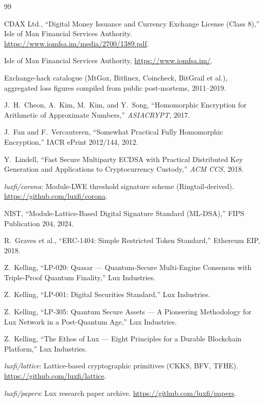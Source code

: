 
\begin{thebibliography}{99}

CDAX Ltd., ``Digital Money Issuance and Currency Exchange License
(Class 8),'' Isle of Man Financial Services Authority.
\url{https://www.iomfsa.im/media/2700/1389.pdf}.

Isle of Man Financial Services Authority,
\url{https://www.iomfsa.im/}.

Exchange-hack catalogue (MtGox, Bitfinex, Coincheck, BitGrail et al.),
aggregated loss figures compiled from public post-mortems, 2011--2019.

J.~H.~Cheon, A.~Kim, M.~Kim, and Y.~Song, ``Homomorphic Encryption for
Arithmetic of Approximate Numbers,'' \textit{ASIACRYPT}, 2017.

J.~Fan and F.~Vercauteren, ``Somewhat Practical Fully Homomorphic
Encryption,'' IACR ePrint 2012/144, 2012.

Y.~Lindell, ``Fast Secure Multiparty ECDSA with Practical Distributed
Key Generation and Applications to Cryptocurrency Custody,''
\textit{ACM CCS}, 2018.

\textit{luxfi/corona}: Module-LWE threshold signature scheme (Ringtail-derived).
\url{https://github.com/luxfi/corona}.

NIST, ``Module-Lattice-Based Digital Signature Standard (ML-DSA),''
FIPS Publication 204, 2024.

R.~Graves et al., ``ERC-1404: Simple Restricted Token Standard,''
Ethereum EIP, 2018.

Z.~Kelling, ``LP-020: Quasar --- Quantum-Secure Multi-Engine Consensus
with Triple-Proof Quantum Finality,'' Lux Industries.

Z.~Kelling, ``LP-001: Digital Securities Standard,'' Lux Industries.

Z.~Kelling, ``LP-305: Quantum Secure Assets --- A Pioneering
Methodology for Lux Network in a Post-Quantum Age,'' Lux Industries.

Z.~Kelling, ``The Ethos of Lux --- Eight Principles for a Durable
Blockchain Platform,'' Lux Industries.

\textit{luxfi/lattice}: Lattice-based cryptographic primitives
(CKKS, BFV, TFHE). \url{https://github.com/luxfi/lattice}.

\textit{luxfi/papers}: Lux research paper archive.
\url{https://github.com/luxfi/papers}.

\end{thebibliography}

